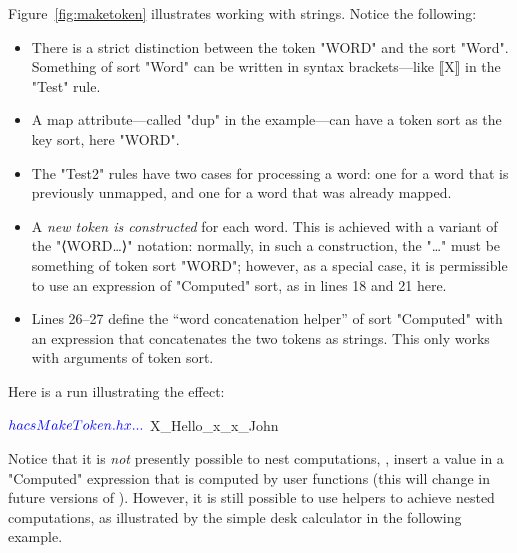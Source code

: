 \documentclass[11pt]{article} %
\begin{document}
\begin{example}
  Figure~\ref{fig:maketoken} illustrates working with strings. Notice the following:
  \begin{itemize}

  \item There is a strict distinction between the token "WORD" and the sort "Word". Something of
    sort "Word" can be written in syntax brackets---like ⟦X⟧ in the "Test" rule.

  \item A map attribute---called "dup" in the example---can have a token sort as the key sort, here
    "WORD".

  \item The "Test2" rules have two cases for processing a word: one for a word that is previously
    unmapped, and one for a word that was already mapped.

  \item A \emph{new token is constructed} for each word. This is achieved with a variant of the
    "⟨WORD…⟩" notation: normally, in such a construction, the "…" must be something of token sort
    "WORD"; however, as a special case, it is permissible to use an expression of "Computed" sort,
    as in lines 18 and 21 here.

  \item Lines 26--27 define the ``word concatenation helper'' of sort "Computed" with an expression
    that concatenates the two tokens as strings. This only works with arguments of token sort.

  \end{itemize}
  Here is a run illustrating the effect:
\begin{code}[commandchars=\\\{\}]
$ \color{blue}{hacs MakeToken.hx}
...
$ 
X_Hello_x_x_John
  \end{code}
\end{example}

Notice that it is \emph{not} presently possible to nest computations, \ie, insert a value in a
"Computed" expression that is computed by user functions (this will change in future versions of
\HAX). However, it is still possible to use helpers to achieve nested computations, as illustrated
by the simple desk calculator in the following example.

\end{document}

